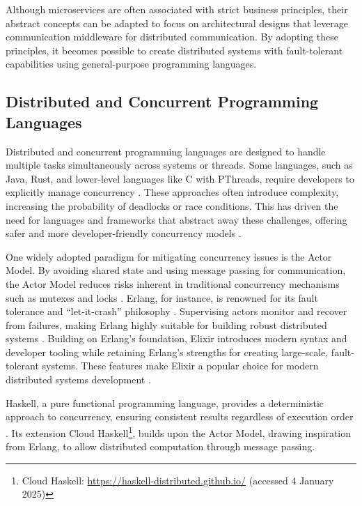 Although microservices are often associated with strict business principles, their abstract concepts can be adapted to focus on architectural designs that leverage communication middleware for distributed communication. By adopting these principles, it becomes possible to create distributed systems with fault-tolerant capabilities using general-purpose programming languages.


\subsection{Distributed and Concurrent Programming Languages}

Distributed and concurrent programming languages are designed to handle multiple tasks simultaneously across systems or threads. Some languages, such as Java, Rust, and lower-level languages like C with PThreads, require developers to explicitly manage concurrency \cite{Valkov2018,Paduraru2018}. These approaches often introduce complexity, increasing the probability of deadlocks or race conditions. This has driven the need for languages and frameworks that abstract away these challenges, offering safer and more developer-friendly concurrency models \cite{Valkov2018}.

One widely adopted paradigm for mitigating concurrency issues is the Actor Model. By avoiding shared state and using message passing for communication, the Actor Model reduces risks inherent in traditional concurrency mechanisms such as mutexes and locks \cite{Valkov2018}. Erlang, for instance, is renowned for its fault tolerance and “let-it-crash” philosophy \cite{Armstrong2013}. Supervising actors monitor and recover from failures, making Erlang highly suitable for building robust distributed systems \cite{Armstrong2013}. Building on Erlang’s foundation, Elixir introduces modern syntax and developer tooling while retaining Erlang’s strengths for creating large-scale, fault-tolerant systems. These features make Elixir a popular choice for modern distributed systems development \cite{Juric2024}.

Haskell, a pure functional programming language, provides a deterministic approach to concurrency, ensuring consistent results regardless of execution order \cite{Valkov2018}. Its extension Cloud Haskell\footnote{Cloud Haskell: \url{https://haskell-distributed.github.io/} (accessed 4 January 2025)}, builds upon the Actor Model, drawing inspiration from Erlang, to allow distributed computation through message passing.

